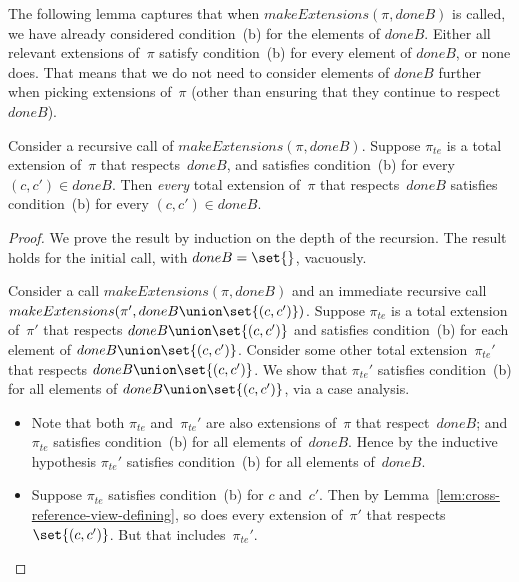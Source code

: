 
The following lemma captures that when $makeExtensions(\pi,doneB)$ is called,
we have already considered condition~(b) for the elements of $doneB$. Either
all relevant extensions of~$\pi$ satisfy condition~(b) for every element of
$doneB$, or none does.  That means that we do not need to consider elements of
$doneB$ further when picking extensions of~$\pi$ (other than ensuring that
they continue to respect~$doneB$).
%
\begin{lemma}
\label{lem:makeExtensions-doneB}
Consider a recursive call of $makeExtensions(\pi,doneB)$.  Suppose $\pi_{te}$
is a total extension of~$\pi$ that respects~$doneB$, and satisfies
condition~(b) for every $(c,c') \in doneB$.  Then \emph{every} total extension
of~$\pi$ that respects~$doneB$ satisfies condition~(b) for every $(c,c') \in
doneB$.
\end{lemma}




\begin{proof}
We prove the result by induction on the depth of the recursion. 
%
The result holds for the initial call, with $doneB = \set{}$, vacuously. 

Consider a call $makeExtensions(\pi,doneB)$ and an immediate recursive call
$make\-Extensions(\pi', doneB \union \set{(c,c')})$.  Suppose $\pi_{te}$ is a
total extension of~$\pi'$ that respects $doneB \union \set{(c,c')}$ and
satisfies condition~(b) for each element of $doneB \union \set{(c,c')}$.
Consider some other total extension~$\pi_{te}'$ that respects
$doneB \union \set{(c,c')}$.  We show that $\pi_{te}'$ satisfies condition~(b)
for all elements of $doneB \union \set{(c,c')}$, via a case analysis.
%
\begin{itemize}
\item Note that both $\pi_{te}$ and~$\pi_{te}'$ are also extensions of~$\pi$
that respect~$doneB$; and $\pi_{te}$ satisfies condition~(b) for all elements
of~$doneB$.  Hence by the inductive hypothesis $\pi_{te}'$ satisfies
condition~(b) for all elements of~$doneB$.

\item Suppose $\pi_{te}$ satisfies condition~(b) for $c$ and~$c'$.  Then by
Lemma~\ref{lem:cross-reference-view-defining}, so does every extension
of~$\pi'$ that respects $\set{(c,c')}$.  But that includes~$\pi_{te}'$.
\end{itemize}
\end{proof}


